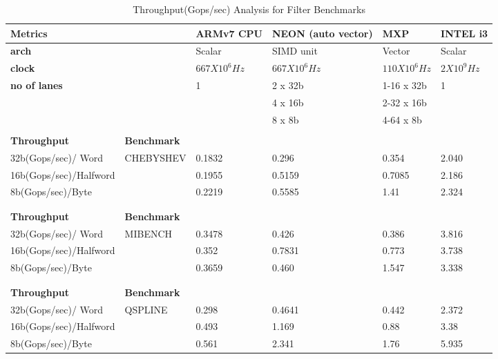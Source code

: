 \begin{table}[htbp]
	\centering
		\begin{adjustbox}{width=.8\textwidth}
		\small
	\begin{tabular}{llllll}
		\toprule
		\textbf{Metrics} &   & \textbf{ARMv7 CPU} & \textbf{NEON (auto vector)} & \textbf{MXP} & \textbf{INTEL i3} \\
		\midrule
		\textbf{arch} &   & Scalar & SIMD unit & Vector & Scalar \\
		\textbf{clock} &   & $667 X 10^{6}Hz$ & $667 X 10^{6}Hz$ & $110 X 10^{6}Hz$ & $2 X 10^{9}Hz$ \\
		\textbf{no of lanes} &   & 1 & 2 x 32b & 1-16 x 32b & 1 \\
		&   &   & 4 x 16b & 2-32 x 16b &  \\
		&   &   & 8 x 8b & 4-64 x 8b &  \\
		&   &   &   &   &  \\
		\midrule
		 \textbf{Throughput} & \textbf{Benchmark} &   &   &   &  \\
		\midrule
		 32b(Gops/sec)/ Word   & CHEBYSHEV & 0.1832 & 0.296 & 0.354 & 2.040 \\
	 16b(Gops/sec)/Halfword &   & 0.1955 & 0.5159 & 0.7085 & 2.186 \\
		 8b(Gops/sec)/Byte &   & 0.2219 & 0.5585 & 1.41 & 2.324 \\
		   &   &   &   &   &  \\
		   &   &   &   &   &  \\
		\midrule
		 \textbf{Throughput} & \textbf{Benchmark} &   &   &   &  \\
		\midrule
		 32b(Gops/sec)/ Word   & MIBENCH & 0.3478 & 0.426 & 0.386 & 3.816 \\
		 16b(Gops/sec)/Halfword &   & 0.352 & 0.7831 & 0.773 & 3.738 \\
		 8b(Gops/sec)/Byte &   & 0.3659 & 0.460 & 1.547 & 3.338 \\
		  &   &   &   &   &  \\
		   &   &   &   &   &  \\
		\midrule
	 \textbf{Throughput} & \textbf{Benchmark} &   &   &   &  \\
		\midrule
	 32b(Gops/sec)/ Word   & QSPLINE & 0.298 & 0.4641 & 0.442 & 2.372 \\
	16b(Gops/sec)/Halfword &   & 0.493 & 1.169 & 0.88 & 3.38 \\
		 8b(Gops/sec)/Byte &   & 0.561 & 2.341 & 1.76 & 5.935 \\
		\bottomrule
	\end{tabular}%
    \end{adjustbox}%

		\caption{Throughput(Gops/sec) Analysis for Filter Benchmarks}
		\label{poly:d}%
\end{table}%
